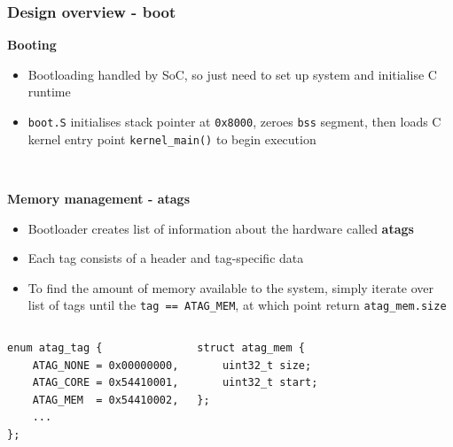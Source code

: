\documentclass[10pt]{beamer}
\begin{document}
\begin{frame}[fragile]
    \frametitle{Design overview - boot}
    \textbf{Booting}
    \begin{itemize}
        \item Bootloading handled by SoC, so just need to set up system and initialise C runtime
        \item \texttt{boot.S} initialises stack pointer at \texttt{0x8000}, zeroes \texttt{bss} segment, then loads C kernel entry point \texttt{kernel\_main()} to begin execution
    \end{itemize} ~

    \textbf{Memory management - atags}
    \begin{itemize}
        \item Bootloader creates list of information about the hardware called \textbf{atags}
        \item Each tag consists of a header and tag-specific data
        \item To find the amount of memory available to the system, simply iterate over list of tags until the \texttt{tag == ATAG\_MEM}, at which point return \texttt{atag\_mem.size}
    \end{itemize}

    \begin{columns}[t]
        \lstset{language=C,basicstyle=\ttfamily}
        \begin{lstlisting}
enum atag_tag {
    ATAG_NONE = 0x00000000,
    ATAG_CORE = 0x54410001,
    ATAG_MEM  = 0x54410002,
    ...
};
        \end{lstlisting}
        \lstset{language=C,basicstyle=\ttfamily}
        \begin{lstlisting}
struct atag_mem {
    uint32_t size;
    uint32_t start;
};
        \end{lstlisting}
    \end{columns}
\end{frame}
\end{document}
